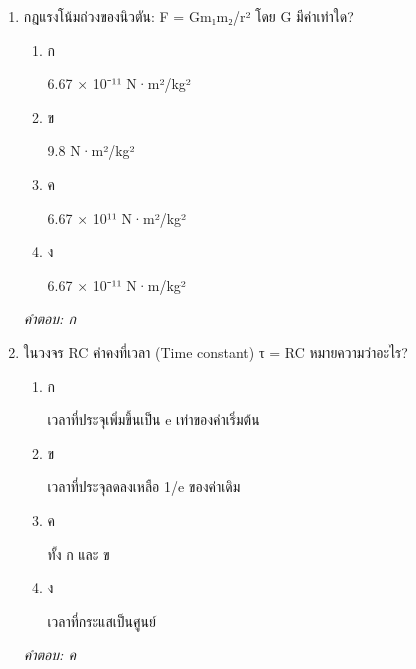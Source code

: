 \documentclass[12pt]{article}
\begin{document}
\begin{enumerate}[label=\arabic*., itemsep=0.5\baselineskip, topsep=0.5\baselineskip, leftmargin=*]
\item กฎแรงโน้มถ่วงของนิวตัน: F = Gm₁m₂/r² โดย G มีค่าเท่าใด?
\begin{enumerate}[label=\alph*)., itemsep=0.3\baselineskip, topsep=0.3\baselineskip]
\item ก\ 
\begin{minipage}[t]{0.9\linewidth}
\raggedright 6.67 × 10⁻¹¹ N·m²/kg²
\end{minipage}
\item ข\ 
\begin{minipage}[t]{0.9\linewidth}
\raggedright 9.8 N·m²/kg²
\end{minipage}
\item ค\ 
\begin{minipage}[t]{0.9\linewidth}
\raggedright 6.67 × 10¹¹ N·m²/kg²
\end{minipage}
\item ง\ 
\begin{minipage}[t]{0.9\linewidth}
\raggedright 6.67 × 10⁻¹¹ N·m/kg²
\end{minipage}
\end{enumerate}
\vspace{-0.3\baselineskip}
\begin{small}
\textit{คำตอบ: ก}
\end{small}

\item ในวงจร RC ค่าคงที่เวลา (Time constant) τ = RC หมายความว่าอะไร?
\begin{enumerate}[label=\alph*)., itemsep=0.3\baselineskip, topsep=0.3\baselineskip]
\item ก\ 
\begin{minipage}[t]{0.9\linewidth}
\raggedright เวลาที่ประจุเพิ่มขึ้นเป็น e เท่าของค่าเริ่มต้น
\end{minipage}
\item ข\ 
\begin{minipage}[t]{0.9\linewidth}
\raggedright เวลาที่ประจุลดลงเหลือ 1/e ของค่าเดิม
\end{minipage}
\item ค\ 
\begin{minipage}[t]{0.9\linewidth}
\raggedright ทั้ง ก และ ข
\end{minipage}
\item ง\ 
\begin{minipage}[t]{0.9\linewidth}
\raggedright เวลาที่กระแสเป็นศูนย์
\end{minipage}
\end{enumerate}
\vspace{-0.3\baselineskip}
\begin{small}
\textit{คำตอบ: ค}
\end{small}


\end{enumerate}
\end{document}
